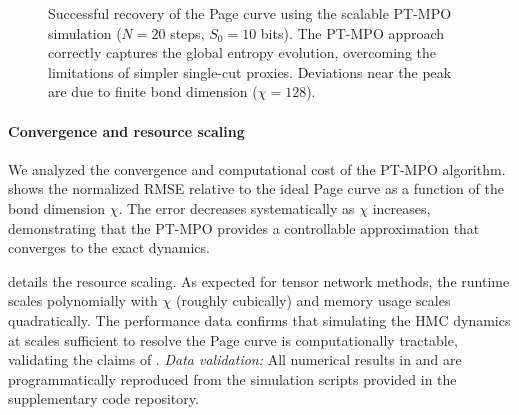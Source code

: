 \documentclass[a4paper,11pt]{article}
\newcommand{\HMC}{\textup{\textsc{HMC}}\xspace}
\theoremstyle{plain}
\theoremstyle{definition}
\theoremstyle{remark}
\newcommand{\datatablePTMPO}{}
\begin{document}
\begin{figure}[htbp]
\centering
{}
\caption{Successful recovery of the Page curve using the scalable PT-MPO simulation ($N=20$ steps, $S_0=10$ bits). The PT-MPO approach correctly captures the global entropy evolution, overcoming the limitations of simpler single-cut proxies. Deviations near the peak are due to finite bond dimension ($\chi=128$).}
\label{fig:ptmpo_page}
\end{figure}

\paragraph{Convergence and resource scaling}
We analyzed the convergence and computational cost of the PT-MPO algorithm.  shows the normalized RMSE relative to the ideal Page curve as a function of the bond dimension $\chi$. The error decreases systematically as $\chi$ increases, demonstrating that the PT-MPO provides a controllable approximation that converges to the exact dynamics.

 details the resource scaling. As expected for tensor network methods, the runtime scales polynomially with $\chi$ (roughly cubically) and memory usage scales quadratically. The performance data confirms that simulating the \HMC{} dynamics at scales sufficient to resolve the Page curve is computationally tractable, validating the claims of .
\emph{Data validation:} All numerical results in  and  are programmatically reproduced from the simulation scripts provided in the supplementary code repository.
\end{document}
